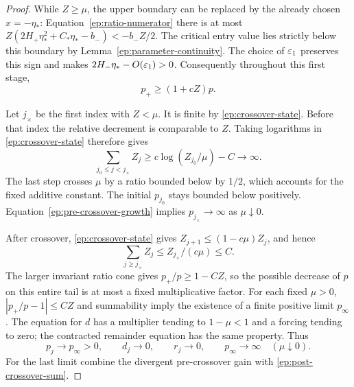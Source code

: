 \begin{proof}
While $Z\ge\mu$, the upper boundary can be replaced by the already
chosen $x=-\eta_*$: Equation~\eqref{ep:ratio-numerator} there is
at most
$Z(2H_+\eta_*^2+C_*\eta_*-b_-)<-b_-Z/2$.
The critical entry value lies strictly below this
boundary by Lemma~\ref{ep:parameter-continuity}.
The choice of $\varepsilon_1$ preserves this sign and makes
$2H_-\eta_*-O(\varepsilon_1)>0$.  Consequently throughout this first stage,
\begin{equation}\label{ep:pre-crossover-growth}
 p_+\ge(1+cZ)p .
\end{equation}

Let $j_\times$ be the first index with $Z<\mu$.
It is finite by \eqref{ep:crossover-state}.
Before that index the relative decrement is comparable
to $Z$.  Taking logarithms in
\eqref{ep:crossover-state} therefore gives
\[
 \sum_{j_0\le j<j_\times}Z_j
 \ge c\log(Z_{j_0}/\mu)-C\longrightarrow\infty .
\]
The last step crosses $\mu$ by a ratio bounded below by
$1/2$, which accounts for the fixed additive constant.
The initial $p_{j_0}$ stays bounded below positively.
Equation~\eqref{ep:pre-crossover-growth} implies
$p_{j_\times}\to\infty$ as $\mu\downarrow0$.

After crossover, \eqref{ep:crossover-state} gives
$Z_{j+1}\le(1-c\mu)Z_j$, and hence
\begin{equation}\label{ep:post-crossover-sum}
 \sum_{j\ge j_\times}Z_j
 \le Z_{j_\times}/(c\mu)\le C .
\end{equation}
The larger invariant ratio cone gives
$p_+/p\ge1-CZ$, so the possible decrease of $p$
on this entire tail is at most a fixed multiplicative
factor.  For each fixed $\mu>0$,
$|p_+/p-1|\le CZ$ and summability imply the existence
of a finite positive limit $p_\infty$.
The equation for $d$ has a multiplier tending to
$1-\mu<1$ and a forcing tending to zero; the contracted
remainder equation has the same property.  Thus
\begin{equation}\label{ep:warm-limits}
 p_j\to p_\infty>0,\qquad d_j\to0,\qquad r_j\to0,
 \qquad p_\infty\to\infty\quad(\mu\downarrow0).
\end{equation}
For the last limit combine the divergent pre-crossover
gain with \eqref{ep:post-crossover-sum}.


\end{proof}

